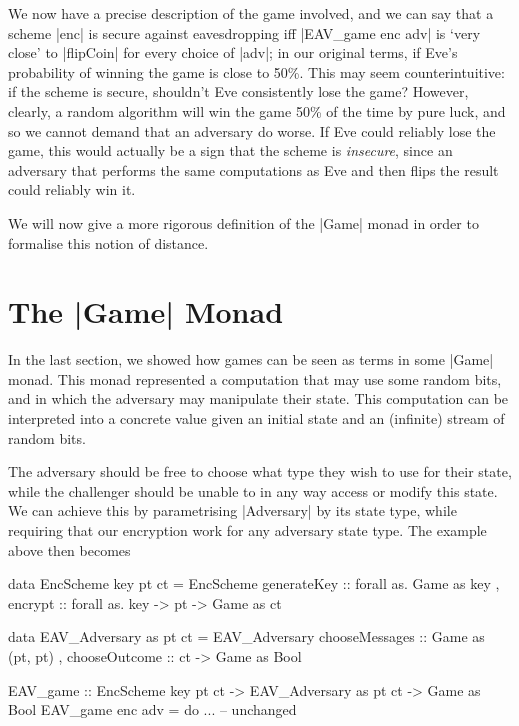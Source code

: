 We now have a precise description of the game involved, and we can say that a scheme |enc| is secure against
eavesdropping iff |EAV_game enc adv| is `very close' to |flipCoin| for every choice of |adv|; in our original terms, if
Eve's probability of winning the game is close to 50\%.  This may seem counterintuitive: if the scheme is secure,
shouldn't Eve consistently lose the game?  However, clearly, a random algorithm will win the game 50\% of the time by
pure luck, and so we cannot demand that an adversary do worse.  If Eve could reliably lose the game, this would actually
be a sign that the scheme is \emph{insecure}, since an adversary that performs the same computations as Eve and then
flips the result could reliably win it.

We will now give a more rigorous definition of the |Game| monad in order to formalise this notion of distance.

\section{The |Game| Monad}

In the last section, we showed how games can be seen as terms in some |Game| monad.  This monad represented a
computation that may use some random bits, and in which the adversary may manipulate their state.  This computation can
be interpreted into a concrete value given an initial state and an (infinite) stream of random bits.

The adversary should be free to choose what type they wish to use for their state, while the challenger should be unable
to in any way access or modify this state.  We can achieve this by parametrising |Adversary| by its state type, while
requiring that our encryption work for any adversary state type.  The example above then becomes
\begin{code}
data EncScheme key pt ct  = EncScheme
                          { generateKey :: forall as. Game as key
                          , encrypt :: forall as. key -> pt -> Game as ct
                          }

data EAV_Adversary as pt ct  = EAV_Adversary
                             { chooseMessages :: Game as (pt, pt)
                             , chooseOutcome :: ct -> Game as Bool
                             }

EAV_game :: EncScheme key pt ct -> EAV_Adversary as pt ct -> Game as Bool
EAV_game enc adv = do
    ... -- unchanged
\end{code}

